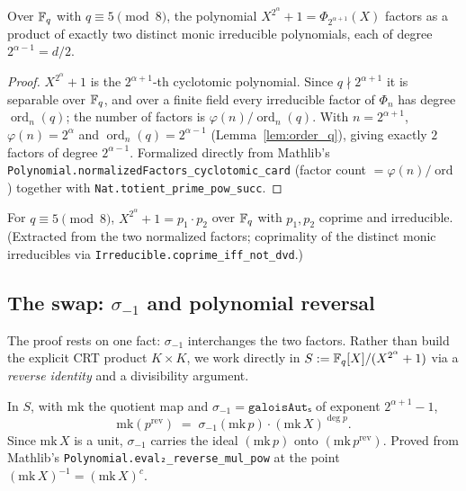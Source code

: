 \begin{lemma}\label{lem:two_factors}
\leanok
{}
Over $\mathbb{F}_q$ with $q \equiv 5 \pmod 8$, the polynomial $X^{2^\alpha}+1 = \Phi_{2^{\alpha+1}}(X)$
factors as a product of exactly two distinct monic irreducible polynomials, each of degree
$2^{\alpha-1} = d/2$.
\end{lemma}

\begin{proof}
\leanok{}
$X^{2^\alpha}+1$ is the $2^{\alpha+1}$-th cyclotomic polynomial. Since $q \nmid 2^{\alpha+1}$ it is
separable over $\mathbb{F}_q$, and over a finite field every irreducible factor of $\Phi_n$ has degree
$\operatorname{ord}_n(q)$; the number of factors is $\varphi(n)/\operatorname{ord}_n(q)$. With
$n = 2^{\alpha+1}$, $\varphi(n) = 2^\alpha$ and $\operatorname{ord}_n(q) = 2^{\alpha-1}$
(Lemma~\ref{lem:order_q}), giving exactly $2$ factors of degree $2^{\alpha-1}$. Formalized directly
from Mathlib's \texttt{Polynomial.normalizedFactors\_cyclotomic\_card} (factor count $=
\varphi(n)/\operatorname{ord}$) together with \texttt{Nat.totient\_prime\_pow\_succ}.
\end{proof}

\begin{lemma}\label{lem:factorization}
\leanok
{}
For $q \equiv 5 \pmod 8$, $X^{2^\alpha}+1 = p_1 \cdot p_2$ over $\mathbb{F}_q$ with $p_1, p_2$ coprime and
irreducible. (Extracted from the two normalized factors; coprimality of the distinct monic
irreducibles via \texttt{Irreducible.coprime\_iff\_not\_dvd}.)
\end{lemma}

\subsection{The swap: \texorpdfstring{$\sigma_{-1}$}{σ(-1)} and polynomial reversal}

The proof rests on one fact: $\sigma_{-1}$ interchanges the two factors. Rather than build the
explicit CRT product $K \times K$, we work directly in $S := \mathbb{F}_q[X]/(X^{2^\alpha}+1)$ via a
\emph{reverse identity} and a divisibility argument.

\begin{lemma}\label{lem:conj_reverse}
\leanok
In $S$, with $\mathrm{mk}$ the quotient map and $\sigma_{-1} = \texttt{galoisAutₛ}$ of exponent
$2^{\alpha+1}-1$,
\[
  \mathrm{mk}(p^{\mathrm{rev}}) \;=\; \sigma_{-1}(\mathrm{mk}\,p)\cdot(\mathrm{mk}\,X)^{\deg p}.
\]
Since $\mathrm{mk}\,X$ is a unit, $\sigma_{-1}$ carries the ideal $(\mathrm{mk}\,p)$ onto
$(\mathrm{mk}\,p^{\mathrm{rev}})$. Proved from Mathlib's
\texttt{Polynomial.eval₂\_reverse\_mul\_pow} at the point $(\mathrm{mk}\,X)^{-1} = (\mathrm{mk}\,X)^{c}$.
\end{lemma}

